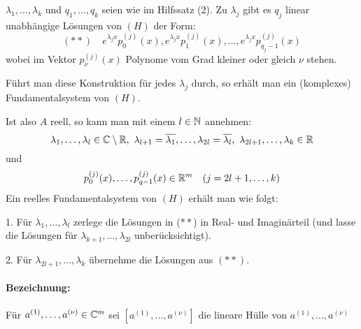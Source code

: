\documentclass[a4paper,twoside,DIV15,BCOR12mm]{scrbook}
\begin{document}
\begin{satz}
$\lambda_1,\ldots,\lambda_k$ und $q_1,\ldots,q_k$ seien wie im Hilfssatz (2). Zu $\lambda_j$ gibt es $q_j$ linear unabhängige Lösungen von $(H)$ der Form:
\[ (**)\quad e^{\lambda_jx}p_0^{(j)}(x), e^{\lambda_jx}p_1^{(j)}(x), \ldots, e^{\lambda_jx}p_{q_j-1}^{(j)}(x) \]
wobei im Vektor $p_\nu^{(j)}(x)$ Polynome vom Grad kleiner oder gleich $\nu$ stehen.

Führt man diese Konstruktion für jedes $\lambda_j$ durch, so erhält man ein (komplexes) Fundamentalsystem von $(H)$.

Ist also $A$ reell, so kann man mit einem $l\in\mathbb{N}$ annehmen:
\[ \lambda_1,\ldots,\lambda_l \in \MdC\setminus\MdR,\ \lambda_{l+1} = \overline{\lambda_1},\ldots,\lambda_{2l} = \overline{\lambda_l},\ \lambda_{2l+1},\ldots,\lambda_k \in \MdR \]
und 
\[ p_0^{(j)}(x), \ldots, p_{q-1}^{(j)}(x) \in \mathbb{R}^m \quad (j=2l+1,\ldots,k)\]
Ein reelles Fundamentalsystem von $(H)$ erhält man wie folgt:

1. Für $\lambda_1,\ldots,\lambda_l$ zerlege die Lösungen in ($**$) in Real- und Imaginärteil (und lasse die Lösungen für $\lambda_{k+1},\ldots,\lambda_{2l}$ unberücksichtigt).

2. Für $\lambda_{2l+1},\ldots,\lambda_{k}$ übernehme die Lösungen aus $(**)$.
\end{satz}

\paragraph{Bezeichnung:} Für $a^{(1)},\ldots,a^{(\nu)} \in \mathbb{C}^m$ sei $[a^{(1)},\ldots,a^{(\nu)}]$ die lineare Hülle von $a^{(1)},\ldots,a^{(\nu)}$
\end{document}
